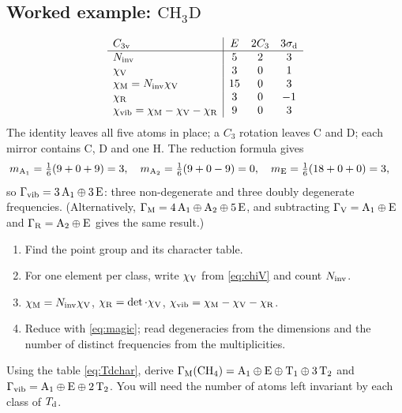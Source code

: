 \subsection{Worked example: \texorpdfstring{$\mathrm{CH_3D}$}{CH3D}}\label{sec:CH3D}
\[
\begin{array}{l|ccc}
C_{3\mathrm{v}} & E & 2C_3 & 3\sigma_{\mathrm{d}}\\\hline
N_{\mathrm{inv}} & 5 & 2 & 3\\
\chi_{\mathrm{V}} & 3 & 0 & 1\\
\chi_{\mathrm{M}}=N_{\mathrm{inv}}\chi_{\mathrm{V}} & 15 & 0 & 3\\
\chi_{\mathrm{R}} & 3 & 0 & -1\\
\chi_{\mathrm{vib}}=\chi_{\mathrm{M}}-\chi_{\mathrm{V}}-\chi_{\mathrm{R}} & 9 & 0 & 3
\end{array}
\]
The identity leaves all five atoms in place; a $C_3$ rotation leaves C and D; each
mirror contains C, D and one H. The reduction formula gives
\begin{align*}
m_{\mathrm{A}_1}&=\tfrac16(9+0+9)=3,\quad
m_{\mathrm{A}_2}=\tfrac16(9+0-9)=0,\quad
m_{\mathrm{E}}=\tfrac16(18+0+0)=3,
\end{align*}
so $\Gamma_{\mathrm{vib}}=3\,\mathrm{A}_1\oplus3\,\mathrm{E}$: three non-degenerate and three doubly
degenerate frequencies. (Alternatively, $\Gamma_{\mathrm{M}}=4\,\mathrm{A}_1\oplus\mathrm{A}_2\oplus5\,\mathrm{E}$,
and subtracting $\Gamma_{\mathrm{V}}=\mathrm{A}_1\oplus\mathrm{E}$ and $\Gamma_{\mathrm{R}}=\mathrm{A}_2\oplus\mathrm{E}$ gives the
same result.)

\begin{keyresult}
\begin{enumerate}
\item Find the point group and its character table.
\item For one element per class, write $\chi_{\mathrm{V}}$ from \eqref{eq:chiV} and count $N_{\mathrm{inv}}$.
\item $\chi_{\mathrm{M}}=N_{\mathrm{inv}}\chi_{\mathrm{V}}$, $\chi_{\mathrm{R}}=\det\cdot\chi_{\mathrm{V}}$, $\chi_{\mathrm{vib}}=\chi_{\mathrm{M}}-\chi_{\mathrm{V}}-\chi_{\mathrm{R}}$.
\item Reduce with \eqref{eq:magic}; read degeneracies from the dimensions and the
      number of distinct frequencies from the multiplicities.
\end{enumerate}
\end{keyresult}

\exercisesection

\begin{exercise}[methane]\label{ex:2:CH4}
Using the table \eqref{eq:Tdchar}, derive
$\Gamma_{\mathrm{M}}(\mathrm{CH_4})=\mathrm{A}_1\oplus\mathrm{E}\oplus\mathrm{T}_1\oplus3\,\mathrm{T}_2$ and
$\Gamma_{\mathrm{vib}}=\mathrm{A}_1\oplus\mathrm{E}\oplus2\,\mathrm{T}_2$. You will need the number of atoms
left invariant by each class of $T_{\mathrm{d}}$.
\end{exercise}

